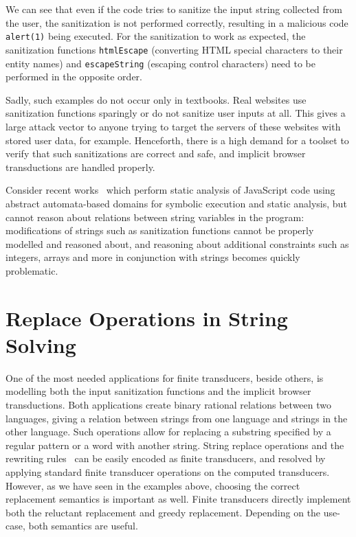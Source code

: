 We can see that even if the code tries to sanitize the input string collected from the user, the sanitization is not performed correctly, resulting in a malicious code \texttt{alert(1)} being executed.
For the sanitization to work as expected, the sanitization functions \texttt{htmlEscape} (converting HTML special characters to their entity names) and \texttt{escapeString} (escaping control characters) need to be performed in the opposite order.

Sadly, such examples do not occur only in textbooks. Real websites use sanitization functions sparingly or do not sanitize user inputs at all.
This gives a large attack vector to anyone trying to target the servers of these websites with stored user data, for example.
Henceforth, there is a high demand for a toolset to verify that such sanitizations are correct and safe, and implicit browser transductions are handled properly.

Consider recent works~\cite{tarsis24,MSAzure20} which perform static analysis of JavaScript code using abstract automata-based domains for symbolic execution and static analysis, but cannot reason about relations between string variables in the program: modifications of strings such as sanitization functions cannot be properly modelled and reasoned about, and reasoning about additional constraints such as integers, arrays and more in conjunction with strings becomes quickly problematic.

\section{Replace Operations in String Solving}
One of the most needed applications for finite transducers, beside others, is modelling both the input sanitization functions and the implicit browser transductions.
Both applications create binary rational relations between two languages, giving a relation between strings from one language and strings in the other language.
Such operations allow for replacing a substring specified by a regular pattern or a word with another string.
String replace operations and the rewriting rules~\cite{rewriting_rules_kaplan94, rewriting_rules_karttunen97} can be easily encoded as finite transducers, and resolved by applying standard finite transducer operations on the computed transducers.
However, as we have seen in the examples above, choosing the correct replacement semantics is important as well.
Finite transducers directly implement both the reluctant replacement and greedy replacement.
Depending on the use-case, both semantics are useful.

